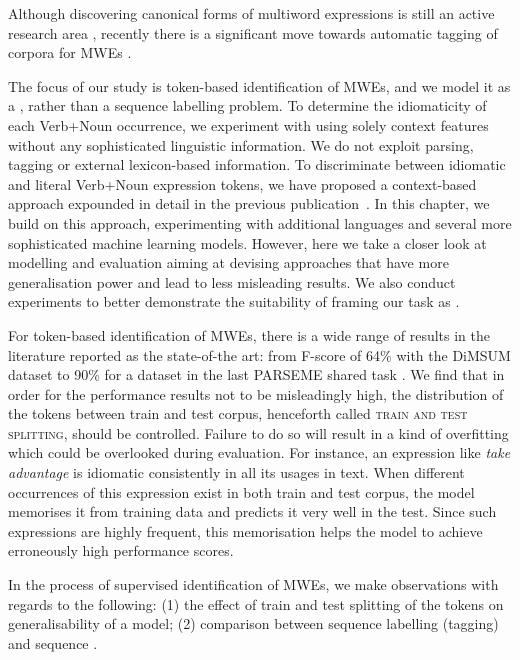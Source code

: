 \documentclass[output=paper,modfonts,nonflat]{langsci/langscibook}
\begin{document}
Although discovering canonical forms of multiword expressions is still an active research area \citep{salehi2013, farahmand2014}, recently there is a significant move towards automatic tagging of corpora for MWEs \citep{Schneider14b,constant2012evaluating}.

The focus of our study is token-based identification of MWEs, and we model it as a , rather than a sequence labelling problem.
To determine the idiomaticity of each Verb+Noun occurrence, we experiment with using solely context features without any sophisticated linguistic information. We do not exploit parsing, tagging or external lexicon-based information.
To discriminate between idiomatic and literal Verb+Noun expression tokens, we have proposed a context-based  approach expounded in detail in the previous publication~\citep{taslimipoor2017}. In this chapter, we build on this approach, experimenting with additional languages and several more sophisticated machine learning models. However, here we take a closer look at modelling and evaluation aiming at devising approaches that have more generalisation power and lead to less misleading results. We also conduct experiments to better demonstrate the suitability of framing our task as .

For token-based identification of MWEs, there is a wide range of results in the literature reported as the state-of-the art: from F-score of 64\% with the DiMSUM dataset \citep{schneider-dimsum:2016} to 90\% \citep{W17-1717} for a dataset in the last PARSEME shared task \citep{MWEWorkshop}.
We find that in order for the performance results not to be misleadingly high, the distribution of the tokens between train and test corpus, henceforth called \textsc{train and test splitting}, should be controlled. Failure to do so will result in a kind of overfitting which could be overlooked during evaluation. For instance, an expression like \textit{take advantage} is idiomatic consistently in all its usages in text. When different occurrences of this expression exist in both train and test corpus, the model memorises it from training data and predicts it very well in the test. Since such expressions are highly frequent, this memorisation helps the model to achieve erroneously high performance scores.

In the process of supervised identification of MWEs, we make observations with regards to the following: (1) the effect of train and test splitting of the tokens on generalisability of a model; (2) comparison between sequence labelling (tagging) and sequence .
\end{document}
